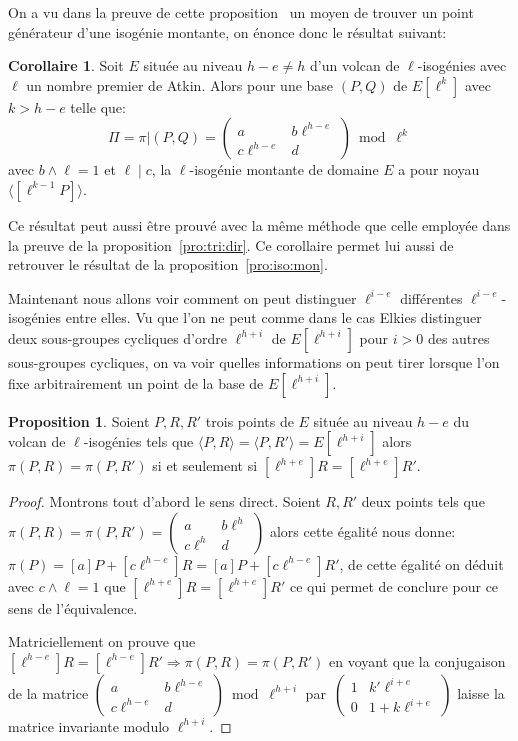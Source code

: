 \documentclass[10pt,a4paper]{book}
\theoremstyle{plain}
\theoremstyle{definition}
\theoremstyle{definition}
\newtheorem{cor}[thm]{Corollaire}
\theoremstyle{definition}
\newtheorem{prop}[thm]{Proposition}
\theoremstyle{definition}
\theoremstyle{remark}
\theoremstyle{remark}
\theoremstyle{definition}
\begin{document}
On a vu dans la preuve de cette proposition~ un moyen de trouver un point
générateur d'une isogénie montante, on énonce donc le résultat suivant:
\begin{cor}
\label{cor:mon:atk}
Soit $E$ située au niveau $h-e \neq h$ d'un volcan de $\ell$-isogénies avec 
$\ell$ un nombre premier de Atkin. Alors pour une base $(P,Q)$ de $E[\ell^k]$
avec $k>h-e$ telle que:
\[
\Pi=\pi|(P,Q)=\left ( \begin{matrix}a & b\ell^{h-e} \\ c\ell^{h-e} & d
\end{matrix}\right ) \bmod \ell^k 
\] 
avec $b \wedge \ell=1$ et $\ell \mid c$, la $\ell$-isogénie montante de domaine
$E$ a pour noyau $\langle [\ell^{k-1}P] \rangle$.
\end{cor}
Ce résultat peut aussi être prouvé avec la même méthode que celle employée dans
la preuve de la proposition~\ref{pro:tri:dir}. Ce corollaire permet lui aussi 
de retrouver le résultat de la proposition~\ref{pro:iso:mon}.

Maintenant nous allons voir comment on peut distinguer $\ell^{i-e}$ différentes 
$\ell^{i-e}$-isogénies entre elles. Vu que l'on ne peut comme dans le 
cas Elkies distinguer deux sous-groupes cycliques d'ordre $\ell^{h+i}$ de 
$E[\ell^{h+i}]$ pour $i>0$ des autres sous-groupes cycliques, on va voir quelles
informations on peut tirer lorsque l'on fixe arbitrairement un point de la base
de $E[\ell^{h+i}]$.

\begin{prop}
\label{pro:atk:equi}
Soient $P,R,R'$ trois points de $E$ située au niveau $h-e$ du volcan de 
$\ell$-isogénies tels que $\langle P,R \rangle = \langle P,R' \rangle= 
E[\ell^{h+i}]$ alors $\pi(P,R)=\pi(P,R') $ si et seulement si $[\ell^{h+e}]R=[\ell^{h+e}]R'$.
\end{prop}

\begin{proof}
Montrons tout d'abord le sens direct.
Soient $R,R'$ deux points tels que $\pi(P,R)=\pi(P,R')=\left ( 
\begin{smallmatrix}a & b\ell^{h}\\c\ell^{h} & d \end{smallmatrix}\right )$ 
alors cette égalité nous donne:
 $\pi(P)=[a]P+[c\ell^{h-e}]R=[a]P+[c\ell^{h-e}]R'$, de
cette égalité on déduit avec $c \wedge \ell = 1$ que $[\ell^{h+e}]R=[\ell^{h+e}]R'$
ce qui permet de conclure pour ce sens de l'équivalence.

Matriciellement on prouve que $[\ell^{h-e}]R=[\ell^{h-e}]R' \Rightarrow 
\pi(P,R)=\pi(P,R')$ en voyant que la conjugaison de la 
matrice $\left ( \begin{smallmatrix}a & b\ell^{h-e}\\c\ell^{h-e} & d
\end{smallmatrix}\right ) \bmod \ell^{h+i}$ par~$\left ( \begin{smallmatrix}1
& k' \ell^{i+e} \\ 0 & 1 + k \ell^{i+e} \end{smallmatrix} \right )$  laisse la matrice invariante 
modulo $\ell^{h+i}$.
\end{proof}
\end{document}
